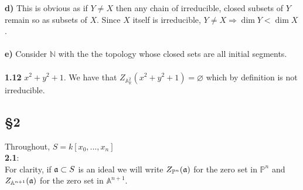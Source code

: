 \documentclass[12pt]{article}
\numberwithin{thm}{subsection}
\numberwithin{defn}{subsection}
\numberwithin{lemma}{subsection}
\numberwithin{example}{subsection}
\numberwithin{notation}{subsection}
\numberwithin{cor}{subsection}
\numberwithin{remark}{subsection}
\numberwithin{condition}{subsection}
\numberwithin{question}{subsection}
\numberwithin{construction}{subsection}
\numberwithin{construction}{subsection}
\numberwithin{construction}{subsection}
\newcommand{\bb}[1]{\mathbb{#1}}
\begin{document}
%
\textbf{d)} This is obvious as if $Y \neq X$ then any chain of irreducible, closed subsets of $Y$ remain so as subsets of $X$. Since $X$ itself is irreducible, $Y \neq X \Longrightarrow \operatorname{dim}Y < \operatorname{dim}X$.\\\\
%
\textbf{e)} Consider $\bb{N}$ with the the topology whose closed sets are all initial segments.\\\\
%
\textbf{1.12} $x^2 + y^2 + 1$. We have that $Z_{\bb{A}^2_\bb{R}}(x^2 + y^2 + 1) = \varnothing$ which by definition is not irreducible.

\subsection{\S 2}
Throughout, $S = k[x_0,...,x_n]$\\
\textbf{2.1}:\\
For clarity, if $\frak{a} \subset S$ is an ideal we will write $Z_{\bb{P}^n}(\frak{a})$ for the zero set in $\bb{P}^n$ and $Z_{\bb{A}^{n+1}}(\frak{a})$ for the zero set in $\bb{A}^{n+1}$.
\end{document}
